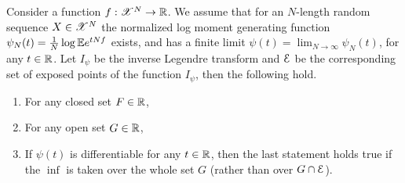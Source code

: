 \documentclass[letterpaper,english,10pt]{article}
\begin{document}
\begin{thm} 
Consider a function $f: \mathscr{X}^N \to \mathbb{R}$. 
We assume that for an $N$-length random sequence $X \in \mathscr{X}^N$ the normalized log moment generating function $\psi_N(t) = \frac{1}{N}\log\mathbb{E} e^{tNf}$ exists, and has a finite limit $\psi(t) = \lim_{N\to\infty}\psi_N(t)$, 
for any $t \in \mathbb{R}$.  
Let $I_\psi$ be the inverse Legendre transform and $\mathcal{E}$ be the corresponding set of exposed points of the function $I_\psi$, 
then the following hold. 
\begin{enumerate}
\item For any closed set $F \in \mathbb{R}$, 
\item 
For any open set $G \in \mathbb{R}$, 
\item  If $\psi(t)$ is differentiable for any $t \in \mathbb{R}$, then the last statement holds true if the $\inf$ is taken over the whole set $G$ (rather than over $G\cap \mathcal{E}$).
\end{enumerate}
\end{thm}
\end{document}

